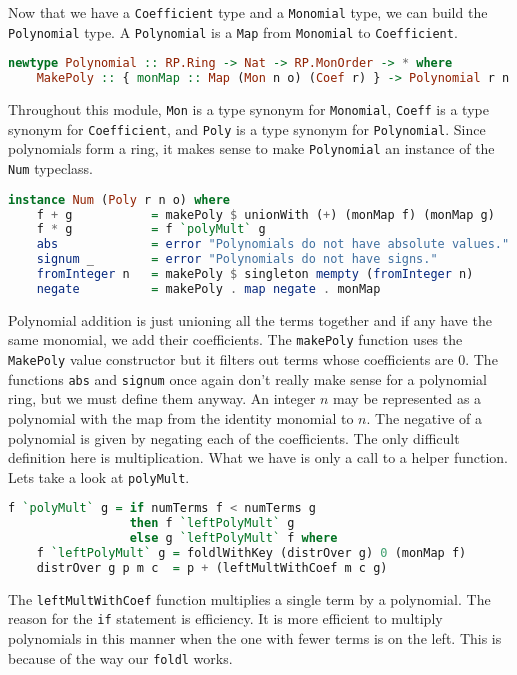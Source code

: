 \documentclass[MS, xcolor=dvipsnames]{wfuthesis}
\theoremstyle{definition}
\begin{document}
Now that we have a \lstinline{Coefficient} type and a \lstinline{Monomial} type, we can build the \lstinline{Polynomial} type. A \lstinline{Polynomial} is a \lstinline{Map} from \lstinline{Monomial} to \lstinline{Coefficient}.
\begin{lstlisting}[language=Haskell]
newtype Polynomial :: RP.Ring -> Nat -> RP.MonOrder -> * where
    MakePoly :: { monMap :: Map (Mon n o) (Coef r) } -> Polynomial r n o
\end{lstlisting}
Throughout this module, \lstinline{Mon} is a type synonym for \lstinline{Monomial}, \lstinline{Coeff} is a type synonym for \lstinline{Coefficient}, and \lstinline{Poly} is a type synonym for \lstinline{Polynomial}. Since polynomials form a ring, it makes sense to make \lstinline{Polynomial} an instance of the \lstinline{Num} typeclass.
\begin{lstlisting}[language=Haskell]
instance Num (Poly r n o) where
    f + g           = makePoly $ unionWith (+) (monMap f) (monMap g)
    f * g           = f `polyMult` g
    abs             = error "Polynomials do not have absolute values."
    signum _        = error "Polynomials do not have signs."
    fromInteger n   = makePoly $ singleton mempty (fromInteger n)
    negate          = makePoly . map negate . monMap
\end{lstlisting}
Polynomial addition is just unioning all the terms together and if any have the same monomial, we add their coefficients. The \lstinline{makePoly} function uses the \lstinline{MakePoly} value constructor but it filters out terms whose coefficients are 0. The functions \lstinline{abs} and \lstinline{signum} once again don't really make sense for a polynomial ring, but we must define them anyway. An integer $n$ may be represented as a polynomial with the map from the identity monomial to $n$. The negative of a polynomial is given by negating each of the coefficients. The only difficult definition here is multiplication. What we have is only a call to a helper function. Lets take a look at \lstinline{polyMult}.
\begin{lstlisting}[language=Haskell]
f `polyMult` g = if numTerms f < numTerms g
                 then f `leftPolyMult` g
                 else g `leftPolyMult` f where
    f `leftPolyMult` g = foldlWithKey (distrOver g) 0 (monMap f)
    distrOver g p m c  = p + (leftMultWithCoef m c g)
\end{lstlisting}
The \lstinline{leftMultWithCoef} function multiplies a single term by a polynomial. The reason for the \lstinline{if} statement is efficiency. It is more efficient to multiply polynomials in this manner when the one with fewer terms is on the left. This is because of the way our \lstinline{foldl} works. \par
\end{document}
